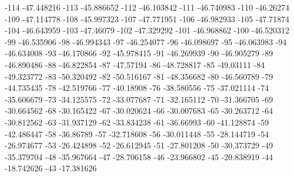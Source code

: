 -114                      -47.448216
-113                      -45.886652
-112                      -46.103842
-111                      -46.740983
-110                       -46.26274
-109                      -47.114778
-108                      -45.997323
-107                      -47.771951
-106                      -46.982933
-105                       -47.71874
-104                      -46.643959
-103                       -47.46079
-102                      -47.329292
-101                      -46.968862
-100                      -46.520312
-99                      -46.535906
-98                      -46.994343
-97                      -46.254077
-96                      -46.098697
-95                      -46.063983
-94                      -46.634008
-93                      -46.170866
-92                      -45.978415
-91                      -46.269939
-90                      -46.905279
-89                      -46.890486
-88                      -46.822854
-87                       -47.57194
-86                      -48.728817
-85                       -49.03111
-84                      -49.323772
-83                      -50.320492
-82                      -50.516167
-81                      -48.356682
-80                      -46.560789
-79                      -44.735435
-78                      -42.519766
-77                       -40.18908
-76                      -38.580556
-75                      -37.021114
-74                      -35.606679
-73                      -34.125575
-72                      -33.077687
-71                      -32.165112
-70                      -31.366705
-69                      -30.664562
-68                      -30.165422
-67                      -30.020624
-66                      -30.007683
-65                      -30.263712
-64                      -30.812562
-63                      -31.937129
-62                      -33.834238
-61                       -36.66993
-60                      -41.128874
-59                      -42.486447
-58                       -36.86789
-57                      -32.718608
-56                      -30.011448
-55                      -28.144719
-54                      -26.974677
-53                      -26.424898
-52                      -26.612945
-51                      -27.801208
-50                      -30.373729
-49                      -35.379704
-48                      -35.967664
-47                      -28.706158
-46                      -23.966802
-45                      -20.838919
-44                      -18.742626
-43                      -17.381626
